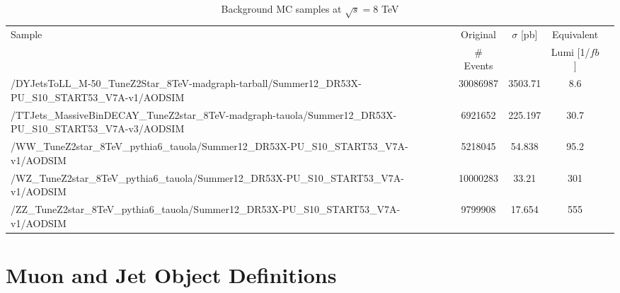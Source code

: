 \documentclass[12pt]{article}
\begin{document}
\begin{table}[h]
\begin{center}
\caption{\label{tab:BGSamples8TeV} Background MC samples at $\sqrt{s}=8$ TeV}
\begin{tabular}{|p{10cm}|c|c|c|c|} \hline
Sample & Original  & $\sigma$ [pb] & Equivalent \\
 &  \# Events &  &  Lumi [1/$fb$] \\
\hline
\hline
/DYJetsToLL\_M-50\_TuneZ2Star\_8TeV-madgraph-tarball/Summer12\_DR53X-PU\_S10\_START53\_V7A-v1/AODSIM &	     30086987 &	  3503.71 &   8.6  \\
\hline                                                                                                                                     
/TTJets\_MassiveBinDECAY\_TuneZ2star\_8TeV-madgraph-tauola/Summer12\_DR53X-PU\_S10\_START53\_V7A-v3/AODSIM &  6921652 &	  225.197 &  30.7  \\
\hline                                                                                                                                                       /WW\_TuneZ2star\_8TeV\_pythia6\_tauola/Summer12\_DR53X-PU\_S10\_START53\_V7A-v1/AODSIM & 	              5218045 &	   54.838 &  95.2  \\
\hline                                                                                                                                     
/WZ\_TuneZ2star\_8TeV\_pythia6\_tauola/Summer12\_DR53X-PU\_S10\_START53\_V7A-v1/AODSIM &	             10000283 &	    33.21 & 301    \\
\hline                                                                                                                                     
/ZZ\_TuneZ2star\_8TeV\_pythia6\_tauola/Summer12\_DR53X-PU\_S10\_START53\_V7A-v1/AODSIM 	&  	              9799908 &    17.654 & 555	   \\
\hline
\end{tabular}
\end{center}
\end{table}

\section{Muon and Jet Object Definitions}
\end{document}
